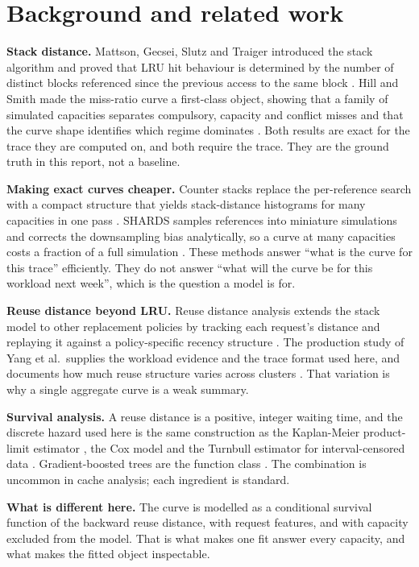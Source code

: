 \section{Background and related work}
\label{sec:related-work}

\textbf{Stack distance.} Mattson, Gecsei, Slutz and Traiger introduced the stack
algorithm and proved that LRU hit behaviour is determined by the number of distinct
blocks referenced since the previous access to the same block
\cite{mattson1970}. Hill and Smith made the miss-ratio curve a first-class object,
showing that a family of simulated capacities separates compulsory, capacity and
conflict misses and that the curve shape identifies which regime dominates
\cite{hill1989}. Both results are exact for the trace they are computed on, and both
require the trace. They are the ground truth in this report, not a baseline.

\textbf{Making exact curves cheaper.} Counter stacks replace the per-reference
search with a compact structure that yields stack-distance histograms for many
capacities in one pass \cite{wires2014}. SHARDS samples references into miniature
simulations and corrects the downsampling bias analytically, so a curve at many
capacities costs a fraction of a full simulation \cite{waldspurger2015}. These
methods answer ``what is the curve for this trace'' efficiently. They do not answer
``what will the curve be for this workload next week'', which is the question a
model is for.

\textbf{Reuse distance beyond LRU.} Reuse distance analysis extends the stack model
to other replacement policies by tracking each request's distance and replaying it
against a policy-specific recency structure \cite{beckmann2016,beckmann2017}. The
production study of Yang et al.\ supplies the workload evidence and the trace
format used here, and documents how much reuse structure varies across clusters
\cite{yang2020}. That variation is why a single aggregate curve is a weak summary.

\textbf{Survival analysis.} A reuse distance is a positive, integer waiting time,
and the discrete hazard used here is the same construction as the Kaplan-Meier
product-limit estimator \cite{kaplan1958}, the Cox model \cite{cox1972} and the
Turnbull estimator for interval-censored data \cite{turnbull1976}. Gradient-boosted
trees are the function class \cite{friedman2001,ke2017}. The combination is
uncommon in cache analysis; each ingredient is standard.

\textbf{What is different here.} The curve is modelled as a conditional survival
function of the backward reuse distance, with request features, and with capacity
excluded from the model. That is what makes one fit answer every capacity, and what
makes the fitted object inspectable.
